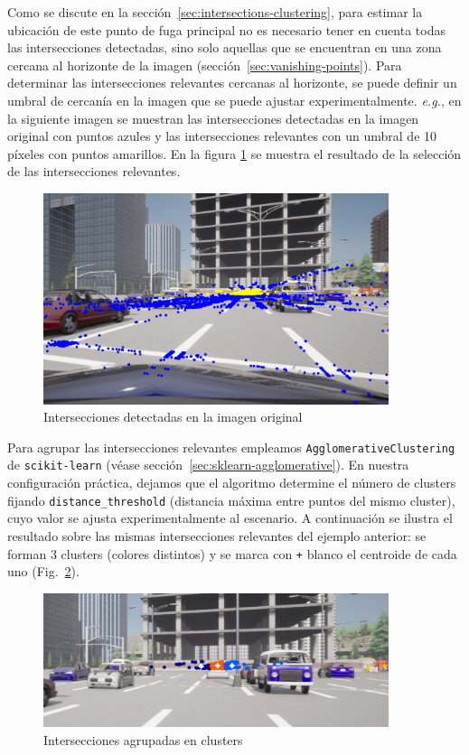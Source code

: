 Como se discute en la sección~\ref{sec:intersections-clustering}, para estimar la ubicación de este punto de fuga principal no es necesario tener en cuenta todas las intersecciones detectadas, sino solo aquellas que se encuentran en una zona cercana al horizonte de la imagen (sección~\ref{sec:vanishing-points}).
Para determinar las intersecciones relevantes cercanas al horizonte, se puede definir un umbral de cercanía en la imagen que se puede ajustar experimentalmente.
\emph{e.g.}, en la siguiente imagen se muestran las intersecciones detectadas en la imagen original con puntos azules
y las intersecciones relevantes con un umbral de 10 píxeles con puntos amarillos.
En la figura \ref{fig:relevantInter} se muestra el resultado de la selección de las intersecciones relevantes. \\
\begin{figure}[!ht]
    \centering
    \includegraphics[width=0.9\textwidth]{img/reticule/relevantInter}
    \caption{Intersecciones detectadas en la imagen original}
    \label{fig:relevantInter}
\end{figure}


Para agrupar las intersecciones relevantes empleamos \texttt{AgglomerativeClustering} de \texttt{scikit-learn}
(véase sección~\ref{sec:sklearn-agglomerative}). En nuestra configuración práctica,
dejamos que el algoritmo determine el número de clusters fijando \texttt{distance\_threshold} (distancia máxima entre puntos del mismo
cluster), cuyo valor se ajusta experimentalmente al escenario. A continuación se ilustra el resultado sobre las mismas
intersecciones relevantes del ejemplo anterior: se forman 3 clusters (colores distintos) y se marca con \texttt{+} blanco el centroide de cada uno
(Fig.~\ref{fig:clusters}).
\begin{figure}[!ht]
    \centering
    \includegraphics[width=0.9\textwidth]{img/reticule/AgglomerativeClustering}
    \caption{Intersecciones agrupadas en clusters}
    \label{fig:clusters}
\end{figure}



